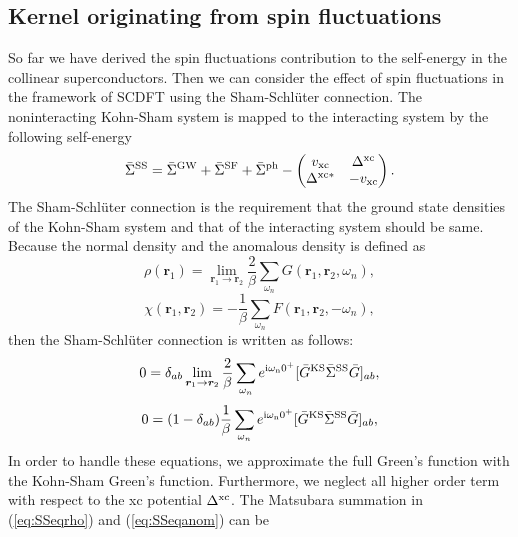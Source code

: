 \subsection{Kernel originating from spin fluctuations}
So far we have derived the spin fluctuations contribution to the self-energy in the collinear superconductors.
Then we can consider the effect of spin fluctuations in the framework of SCDFT using the Sham-Schl\"{u}ter connection\cite{Sham1983,MarquesphD}.
The noninteracting Kohn-Sham system is mapped to the interacting system by the following self-energy
%
\begin{equation}
	\bar{\Sigma}^{\rm SS} = \bar{\Sigma}^{\rm GW} + \bar{\Sigma}^{\rm SF} + \bar{\Sigma}^{\rm ph}
	- 
	\begin{pmatrix}
		v_{\rm xc}  &   \Delta^{\rm xc}   \\
		\Delta^{\rm xc\ast}  &  -v_{\rm xc}
	\end{pmatrix}.
	\label{eq:SSself-energy}
\end{equation}
The Sham-Schl\"{u}ter connection is the requirement that the ground state densities of the Kohn-Sham
system and that of the interacting system should be same.
Because the normal density and the anomalous density is defined as 
%
\begin{equation}
	\rho(\bm r_1) = \lim_{\bm r_1 \to \bm r_2}
	\frac{2}{\beta}\sum_{\omega_n}G(\bm r_1,\bm r_2,\omega_n),
	\label{eq:normaldensity}
\end{equation}
%
\begin{equation}
	\chi(\bm r_1, \bm r_2) = - \frac{1}{\beta}\sum_{\omega_n}F(\bm r_1, \bm r_2, -\omega_n),
	\label{eq:anomdensity}
\end{equation}
%
then the Sham-Schl\"{u}ter connection is written as follows:
%
\begin{equation}
	0 = \delta_{ab}\lim_{\bm r_1 \to \bm r_2} \frac{2}{\beta} 
	\sum_{\omega_n}e^{\rm i\omega_n0^{+}}[\bar{G}^{\rm KS}\bar{\Sigma}^{\rm SS}\bar{G}]_{ab},
	\label{eq:SSeqrho}
\end{equation}
%
\begin{equation}
	0 = (1-\delta_{ab})\frac{1}{\beta}\sum_{\omega_n}
	e^{\rm i\omega_n0^{+}}[\bar{G}^{\rm KS}\bar{\Sigma}^{\rm SS}\bar{G}]_{ab},
	\label{eq:SSeqanom}
\end{equation}
%
In order to handle these equations, we approximate the full Green's function with the Kohn-Sham
Green's function. Furthermore, we neglect all higher order term with respect to the xc potential
$\Delta^{\rm xc}$. The Matsubara summation in (\ref{eq:SSeqrho}) and (\ref{eq:SSeqanom}) can be
